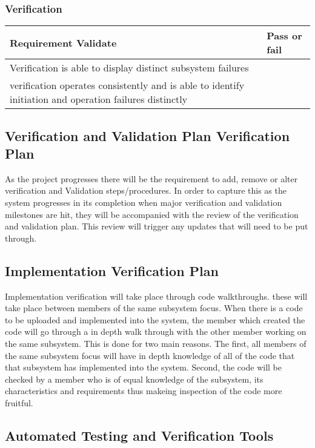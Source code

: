 \documentclass[12pt, titlepage]{article}
\begin{document}
\subsubsection{Verification}
\begin{center}
 \begin{tabular}{ |m{10cm}|m{3cm}| } 
   \hline
   \textbf{Requirement Validate} & \textbf{Pass or fail } \\ 
   \hline
    Verification is able to display distinct subsystem failures& \\
    verification operates consistently and is able to identify initiation and operation failures distinctly & \\

   \hline
 \end{tabular}
\end{center}


\subsection{Verification and Validation Plan Verification Plan}
As the project progresses there will be the requirement to add, remove or alter verification and 
Validation steps/procedures. In order to capture this as the system progresses in its completion 
when major verification and validation milestones are hit, they will be accompanied with the
review of the verification and validation plan. This review will trigger any updates that will
need to be put through.

\subsection{Implementation Verification Plan}
Implementation verification will take place through code walkthroughs. these will take place between
 members of the same subsystem focus. When there is a code to be uploaded and implemented into the system,
  the member which created the code will go through a in depth walk through with the other member working
   on the same subsystem. This is done for two main reasons. The first, all members of the same subsystem 
   focus will have in depth knowledge of all of the code that that subsystem has implemented into the system.
    Second, the code will be checked by a member who is of equal knowledge of the subsystem, its 
    characteristics and requirements thus makeing inspection of the code more fruitful.


\subsection{Automated Testing and Verification Tools}
\end{document}
